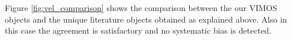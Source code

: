 \documentclass[useAMS,usenatbib]{mn2e}
\newcommand{\kms}{\mbox{\,km~s$^{-1}$}}
\begin{document}
Figure \ref{fig:vel_comparison} shows the comparison between the our VIMOS objects and the unique literature objects obtained as explained above. Also in this case the agreement is satisfactory and no systematic bias is detected. 


\end{document}
